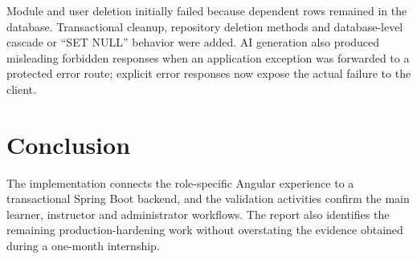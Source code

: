 Module and user deletion initially failed because dependent rows remained in
the database. Transactional cleanup, repository deletion methods and
database-level cascade or ``SET NULL'' behavior were added. AI generation also
produced misleading forbidden responses when an application exception was
forwarded to a protected error route; explicit error responses now expose the
actual failure to the client.



\section*{Conclusion}
The implementation connects the role-specific Angular experience to a
transactional Spring Boot backend, and the validation activities confirm the
main learner, instructor and administrator workflows. The report also
identifies the remaining production-hardening work without overstating the
evidence obtained during a one-month internship.
